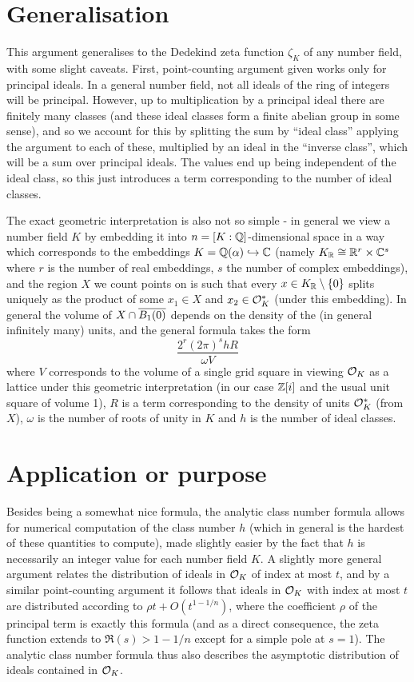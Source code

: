 \documentclass[11pt]{article}
\begin{document}
\section{Generalisation}
This argument generalises to the Dedekind zeta function $\zeta_K$ of any number field, with some slight caveats. First, point-counting argument given works only for principal ideals. In a general number field, not all ideals of the ring of integers will be principal. However, up to multiplication by a principal ideal there are finitely many classes (and these ideal classes form a finite abelian group in some sense), and so we account for this by splitting the sum by ``ideal class'' applying the argument to each of these, multiplied by an ideal in the ``inverse class'', which will be a sum over principal ideals. The values end up being independent of the ideal class, so this just introduces a term corresponding to the number of ideal classes.

The exact geometric interpretation is also not so simple - in general we view a number field $K$ by embedding it into $n = [K : \mathbb{Q}]$-dimensional space in a way which corresponds to the embeddings $K = \mathbb{Q}(\alpha) \hookrightarrow \mathbb{C}$ (namely $K_{\mathbb{R}} \cong \mathbb{R}^r \times \mathbb{C}^s$ where $r$ is the number of real embeddings, $s$ the number of complex embeddings), and the region $X$ we count points on is such that every $x \in K_{\mathbb{R}} \setminus \left\{  0  \right\}$ splits uniquely as the product of some $x_1 \in X$ and $x_2 \in \mathcal{O}_K^*$ (under this embedding). In general the volume of $X \cap \overline{B_1(0)}$ depends on the density of the (in general infinitely many) units, and the general formula takes the form
$$
    \frac{2^r(2\pi)^s hR}{\omega V}
$$
where $V$ corresponds to the volume of a single grid square in viewing $\mathcal{O}_K$ as a lattice under this geometric interpretation (in our case $\mathbb{Z}[i]$ and the usual unit square of volume 1), $R$ is a term corresponding to the density of units $\mathcal{O}_K^*$ (from $X$), $\omega$ is the number of roots of unity in $K$ and $h$ is the number of ideal classes.
\section{Application or purpose}
Besides being a somewhat nice formula, the analytic class number formula allows for numerical computation of the class number $h$ (which in general is the hardest of these quantities to compute), made slightly easier by the fact that $h$ is necessarily an integer value for each number field $K$. A slightly more general argument relates the distribution of ideals in $\mathcal{O}_K$ of index at most $t$, and by a similar point-counting argument it follows that ideals in $\mathcal{O}_K$ with index at most $t$ are distributed according to $\rho t + O(t^{1 - 1/n})$, where the coefficient $\rho$ of the principal term is exactly this formula (and as a direct consequence, the zeta function extends to $\Re(s) > 1 - 1/n$ except for a simple pole at $s = 1$). The analytic class number formula thus also describes the asymptotic distribution of ideals contained in $\mathcal{O}_K$.
\end{document}
